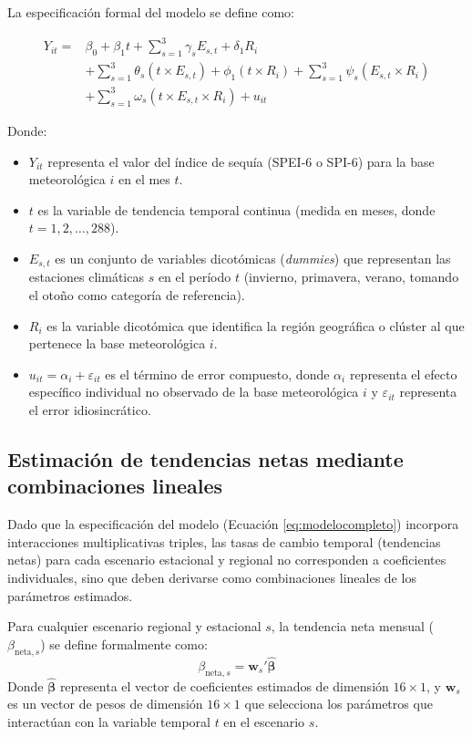 La especificación formal del modelo se define como:

\begin{equation}
\begin{split}
    Y_{it} = & \beta_0 + \beta_1 t + \sum_{s=1}^{3} \gamma_s E_{s,t} + \delta_1 R_i \\
    & + \sum_{s=1}^{3} \theta_s (t \times E_{s,t}) + \phi_1 (t \times R_i) + \sum_{s=1}^{3} \psi_s (E_{s,t} \times R_i) \\
    & + \sum_{s=1}^{3} \omega_s (t \times E_{s,t} \times R_i) + u_{it}
\end{split}
\label{eq:modelocompleto}
\end{equation}

Donde:
\begin{itemize}
    \item $Y_{it}$ representa el valor del índice de sequía (SPEI-6 o SPI-6) para la base meteorológica $i$ en el mes $t$.
    \item $t$ es la variable de tendencia temporal continua (medida en meses, donde $t = 1, 2, \dots, 288$).
    \item $E_{s,t}$ es un conjunto de variables dicotómicas (\textit{dummies}) que representan las estaciones climáticas $s$ en el período $t$ (invierno, primavera, verano, tomando el otoño como categoría de referencia).
    \item $R_i$ es la variable dicotómica que identifica la región geográfica o clúster al que pertenece la base meteorológica $i$.
    \item $u_{it} = \alpha_i + \varepsilon_{it}$ es el término de error compuesto, donde $\alpha_i$ representa el efecto específico individual no observado de la base meteorológica $i$ y $\varepsilon_{it}$ representa el error idiosincrático.
\end{itemize}

\subsection{Estimación de tendencias netas mediante combinaciones lineales}

Dado que la especificación del modelo (Ecuación \ref{eq:modelocompleto}) incorpora interacciones multiplicativas triples, las tasas de cambio temporal (tendencias netas) para cada escenario estacional y regional no corresponden a coeficientes individuales, sino que deben derivarse como combinaciones lineales de los parámetros estimados. 

Para cualquier escenario regional y estacional $s$, la tendencia neta mensual ($\beta_{\text{neta}, s}$) se define formalmente como:
\begin{equation}
    \beta_{\text{neta}, s} = \mathbf{w}_s' \boldsymbol{\hat{\beta}}
\label{eq:combinacion_lineal}
\end{equation}
Donde $\boldsymbol{\hat{\beta}}$ representa el vector de coeficientes estimados de dimensión $16 \times 1$, y $\mathbf{w}_s$ es un vector de pesos de dimensión $16 \times 1$ que selecciona los parámetros que interactúan con la variable temporal $t$ en el escenario $s$.


